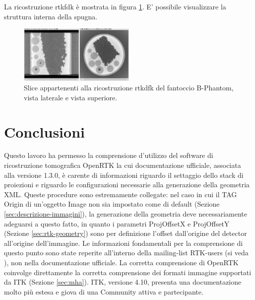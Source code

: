 \documentclass[a4paper,12pt, doubleside]{report}
\begin{document}
                
                La ricostruzione rtkfdk è mostrata in figura \ref{fig:boccia_recon}. E' possibile visualizzare la struttura interna della spugna.
                
                 \begin{figure}[h]
                    \centering
                    \includegraphics[width=0.5\textwidth]{boccia_recon}
                    \caption{Slice appartenenti alla ricostruzione rtkdfk del fantoccio B-Phantom, vista laterale e vista superiore.}
                    \label{fig:boccia_recon}
                \end{figure}
        
        
        \chapter*{Conclusioni}
            \par
                Questo lavoro ha permesso la comprensione d'utilizzo del software di ricostruzione tomografica OpenRTK la cui documentazione ufficiale, associata alla versione 1.3.0, è carente di informazioni riguardo il settaggio dello stack di proiezioni e riguardo le configurazioni necessarie alla generazione della geometria XML. Queste procedure sono estremamente collegate: nel caso in cui il TAG Origin di un'oggetto Image non sia impostato come di default (Sezione \ref{sec:descrizione-immagini}), la generazione della geometria deve necessariamente adeguarsi a questo fatto, in quanto i parametri ProjOffsetX e ProjOffsetY (Sezione \ref{sec:rtk-geometry}) sono per definizione l'offset dall'origine del detector all'origine dell'immagine. Le informazioni fondamentali per la comprensione di questo punto sono state reperite all'interno della mailing-list RTK-users (si veda \cite{rtk-users-proj-offset}), non nella documentazione ufficiale. La corretta comprensione di OpenRTK coinvolge direttamente la corretta comprensione dei formati immagine supportati da ITK (Sezione \ref{sec:mha}). ITK, versione 4.10, presenta una documentazione molto più estesa e giova di una Community attiva e partecipante. 
            
\end{document}
